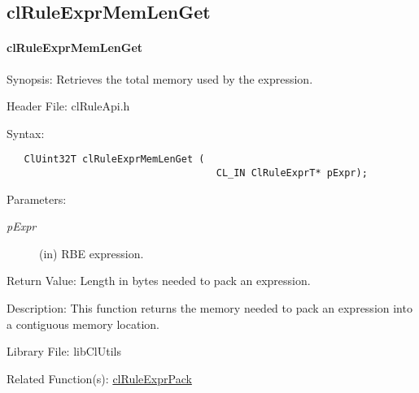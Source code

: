 \begin{flushleft}
\subsection{clRuleExprMemLenGet}
\hypertarget{pagerule117}{}\paragraph{cl\-Rule\-Expr\-Mem\-Len\-Get}\label{pagerule117}
\begin{Desc}
\item[Synopsis:]Retrieves the total memory used by the expression.\end{Desc}
\begin{Desc}
\item[Header File:]clRuleApi.h\end{Desc}
\begin{Desc}
\item[Syntax:]

\footnotesize\begin{verbatim}   ClUint32T clRuleExprMemLenGet (
                              		CL_IN ClRuleExprT* pExpr);
\end{verbatim}
\normalsize
\end{Desc}
\begin{Desc}
\item[Parameters:]
\begin{description}
\item[{\em p\-Expr}](in) RBE expression.\end{description}
\end{Desc}
\begin{Desc}
\item[Return Value:]Length in bytes needed to pack an expression.\end{Desc}
\begin{Desc}
\item[Description:]This function returns the memory needed to pack an expression into a contiguous memory location.\end{Desc}
\begin{Desc}
\item[Library File:]lib\-Cl\-Utils\end{Desc}
\begin{Desc}
\item[Related Function(s):]\hyperlink{pagerule118}{cl\-Rule\-Expr\-Pack} \end{Desc}
\newpage


\end{flushleft}
